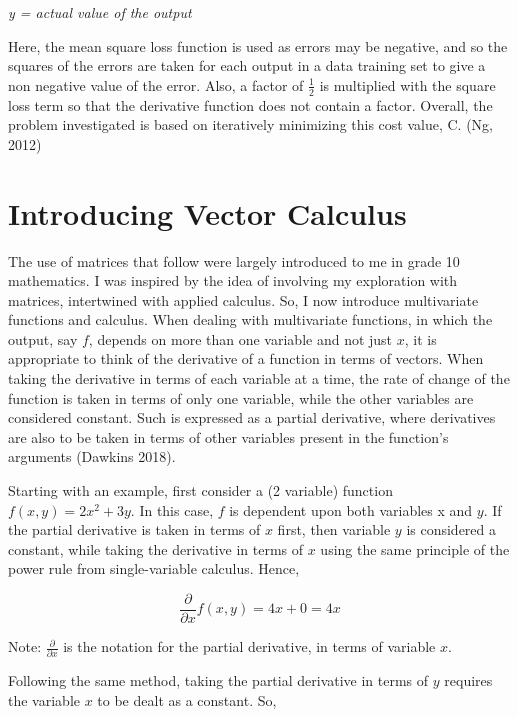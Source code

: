 \documentclass[12pt,a4paper]{article}
\begin{document}
\textit{y = actual value of the output}

\hspace{}

Here, the mean square loss function is used as errors may be negative, and so the squares of the errors are taken for each output in a data training set to give a non negative value of the error. Also, a factor of $\frac{1}{2}$ is multiplied with the square loss term so that the derivative function does not contain a factor. Overall, the problem investigated is based on iteratively minimizing this cost value, C. (Ng, 2012) 




\section{Introducing Vector Calculus}
The use of matrices that follow were largely introduced to me in grade 10 mathematics. I was inspired by the idea of involving my exploration with matrices, intertwined with applied calculus. So, I now introduce multivariate functions and calculus. When dealing with multivariate functions, in which the output, say $f$, depends on more than one variable and not just $x$, it is appropriate to think of the derivative of a function in terms of vectors. When taking the derivative in terms of each variable at a time, the rate of change of the function is taken in terms of only one variable, while the other variables are considered constant. Such is expressed as a partial derivative, where derivatives are also to be taken in terms of other variables present in the function’s arguments (Dawkins 2018).

Starting with an example, first consider a (2 variable) function $f(x,y) = 2x^2+3y$. In this case, $f$ is dependent upon both variables x and $y$. If the partial derivative is taken in terms of $x$ first, then variable $y$ is considered a constant, while taking the derivative in terms of $x$ using the same principle of the power rule from single-variable calculus. Hence,


\begin{equation}
\frac{\partial}{\partial x}f\left(x,y\right)=4x+0=4x
\end{equation}


Note: $\frac{\partial}{\partial x}$ is the notation for the partial derivative, in terms of variable $x$.


Following the same method, taking the partial derivative in terms of $y$ requires the variable $x$ to be dealt as a constant. So,
\end{document}
